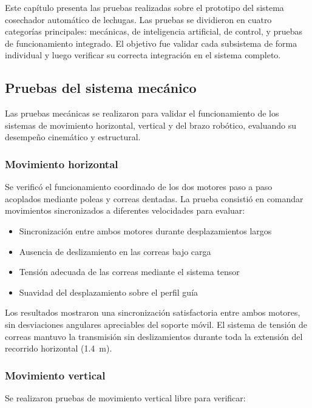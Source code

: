 
Este capítulo presenta las pruebas realizadas sobre el prototipo del sistema cosechador automático de lechugas. Las pruebas se dividieron en cuatro categorías principales: mecánicas, de inteligencia artificial, de control, y pruebas de funcionamiento integrado. El objetivo fue validar cada subsistema de forma individual y luego verificar su correcta integración en el sistema completo.

\subsection{Pruebas del sistema mecánico}

Las pruebas mecánicas se realizaron para validar el funcionamiento de los sistemas de movimiento horizontal, vertical y del brazo robótico, evaluando su desempeño cinemático y estructural.

\subsubsection{Movimiento horizontal}

Se verificó el funcionamiento coordinado de los dos motores paso a paso acoplados mediante poleas y correas dentadas. La prueba consistió en comandar movimientos sincronizados a diferentes velocidades para evaluar:

\begin{itemize}
    \item Sincronización entre ambos motores durante desplazamientos largos
    \item Ausencia de deslizamiento en las correas bajo carga
    \item Tensión adecuada de las correas mediante el sistema tensor
    \item Suavidad del desplazamiento sobre el perfil guía
\end{itemize}

Los resultados mostraron una sincronización satisfactoria entre ambos motores, sin desviaciones angulares apreciables del soporte móvil. El sistema de tensión de correas mantuvo la transmisión sin deslizamientos durante toda la extensión del recorrido horizontal (1.4~m).

\subsubsection{Movimiento vertical}

Se realizaron pruebas de movimiento vertical libre para verificar:

